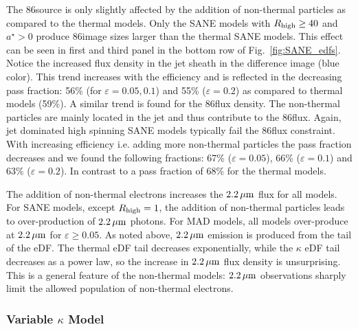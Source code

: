 
The 86\GHz source is only slightly affected by the addition of non-thermal particles as compared to the thermal models.
Only the SANE models with $R_{\rm high}\geq 40$ and $a^{\star}>0$ produce 86\GHz image sizes larger than the thermal SANE models.
This effect can be seen in  first and third panel in the bottom row of Fig.~\ref{fig:SANE_edfs}.
Notice the increased flux density in the jet sheath in the difference image (blue color).
This trend increases with the efficiency and is reflected in the decreasing pass fraction: 56\% (for $\varepsilon=0.05,0.1$) and 55\% ($\varepsilon=0.2$) as compared to thermal models (59\%).
A similar trend is found for the 86\GHz flux density.
The non-thermal particles are mainly located in the jet and thus contribute to the 86\GHz flux.
Again, jet dominated high spinning SANE models typically fail the 86\GHz flux constraint.
With increasing efficiency i.e.
adding more non-thermal particles the pass fraction decreases and we found the following fractions: 67\% ($\varepsilon=0.05$), 66\% ($\varepsilon=0.1$) and 63\% ($\varepsilon=0.2$).
In contrast to a pass fraction of 68\% for the thermal models.


The addition of non-thermal electrons increases the $2.2\,\mu\mathrm{m}$ flux for all models.
For SANE models, except $R_\mathrm{high}=1$, the addition of non-thermal particles leads to over-production of $2.2\,\mu\mathrm{m}$ photons.
For MAD models, all models over-produce at $2.2\,\mu\mathrm{m}$ for $\varepsilon \ge 0.05$.
As noted above, $2.2\,\mu\mathrm{m}$ emission is produced from the tail of the eDF.
The thermal eDF tail decreases exponentially, while the $\kappa$ eDF tail decreases as a power law, so the increase in $2.2\,\mu\mathrm{m}$ flux density is unsurprising.
This is a general feature of the non-thermal models: $2.2\,\mu\mathrm{m}$ observations sharply limit the allowed population of non-thermal electrons.

\subsubsection{Variable \texorpdfstring{$\kappa$}{kappa} Model}

